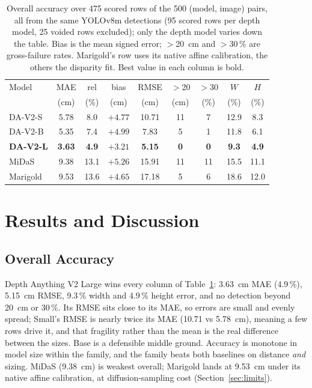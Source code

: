 \documentclass[conference]{IEEEtran}
\begin{document}
\begin{table}[!t]
\centering
\caption{Overall accuracy over 475 scored rows of the 500 (model, image) pairs,
all from the same YOLOv8m detections (95 scored rows per depth model, 25 voided
rows excluded); only the depth
model varies down the table. Bias is the mean signed error; $>$20~cm and
$>$30\,\% are gross-failure rates. Marigold's row uses its native affine
calibration, the others the disparity fit. Best value in
each column is bold.}
\label{tab:overall}
\footnotesize
\setlength{\tabcolsep}{3.5pt}
\begin{tabular}{lcccccccc}
\toprule
Model & MAE & rel & bias & RMSE & $>$20 & $>$30 & $W$ & $H$\\
      & (cm) & (\%) & (cm) & (cm) & (cm) & (\%) & (\%) & (\%)\\
\midrule
DA-V2-S & 5.78 & 8.0 & $+4.77$ & 10.71 & 11 & 7 & 12.9 & 8.3\\
DA-V2-B & 5.35 & 7.4 & $+4.99$ & 7.83 & 5 & 1 & 11.8 & 6.1\\
\textbf{DA-V2-L} & \textbf{3.63} & \textbf{4.9} & $+3.21$ & \textbf{5.15} &
\textbf{0} & \textbf{0} & \textbf{9.3} & \textbf{4.9}\\
MiDaS & 9.38 & 13.1 & $+5.26$ & 15.91 & 11 & 11 & 15.5 & 11.1\\
Marigold & 9.53 & 13.6 & $+4.65$ & 17.18 & 5 & 6 & 18.6 & 12.0\\
\bottomrule
\end{tabular}
\end{table}

\section{Results and Discussion}
\label{sec:results}

\subsection{Overall Accuracy}
Depth Anything V2 Large wins every column of Table~\ref{tab:overall}: 3.63~cm MAE
(4.9\,\%), 5.15~cm RMSE, 9.3\,\% width and 4.9\,\% height error, and no detection
beyond 20~cm or 30\,\%. Its RMSE sits close to its MAE, so errors are small and
evenly spread; Small's RMSE is nearly twice its MAE (10.71 vs 5.78~cm), meaning a
few rows drive it, and that fragility rather than the mean is the real difference
between the sizes. Base is a defensible middle ground. Accuracy is monotone in
model size within the family, and the family beats both baselines on distance
\emph{and} sizing. MiDaS (9.38~cm) is weakest overall; Marigold lands at 9.53~cm
under its native affine calibration, at diffusion-sampling cost
(Section~\ref{sec:limits}).
\end{document}
